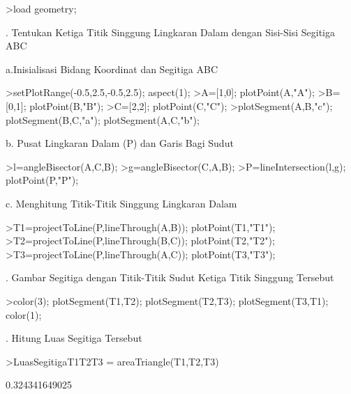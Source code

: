 \documentclass{article}
\newenvironment{eulernotebook}{\par}{\par}
\newenvironment{eulercomment}{\par\medskip}{\par\medskip}
\begin{document}
\begin{eulernotebook}
\begin{eulercomment}
\end{eulercomment}
\begin{eulerprompt}
>load geometry;
\end{eulerprompt}
\begin{eulercomment}
1. Tentukan Ketiga Titik Singgung Lingkaran Dalam dengan Sisi-Sisi
Segitiga ABC\\
\end{eulercomment}
\begin{eulerttcomment}
   a.Inisialisasi Bidang Koordinat dan Segitiga ABC
\end{eulerttcomment}
\begin{eulerprompt}
>setPlotRange(-0.5,2.5,-0.5,2.5); aspect(1);
>A=[1,0]; plotPoint(A,"A");
>B=[0,1]; plotPoint(B,"B");
>C=[2,2]; plotPoint(C,"C");
>plotSegment(A,B,"c"); plotSegment(B,C,"a"); plotSegment(A,C,"b");
\end{eulerprompt}
\begin{eulerttcomment}
   b. Pusat Lingkaran Dalam (P) dan Garis Bagi Sudut
\end{eulerttcomment}
\begin{eulerprompt}
>l=angleBisector(A,C,B);
>g=angleBisector(C,A,B);
>P=lineIntersection(l,g); plotPoint(P,"P");
\end{eulerprompt}
\begin{eulerttcomment}
   c.  Menghitung Titik-Titik Singgung Lingkaran Dalam
\end{eulerttcomment}
\begin{eulerprompt}
>T1=projectToLine(P,lineThrough(A,B)); plotPoint(T1,"T1");
>T2=projectToLine(P,lineThrough(B,C)); plotPoint(T2,"T2");
>T3=projectToLine(P,lineThrough(A,C)); plotPoint(T3,"T3");
\end{eulerprompt}
\begin{eulercomment}
2. Gambar Segitiga dengan Titik-Titik Sudut Ketiga Titik Singgung
Tersebut
\end{eulercomment}
\begin{eulerprompt}
>color(3); plotSegment(T1,T2); plotSegment(T2,T3); plotSegment(T3,T1); color(1);
\end{eulerprompt}
\begin{eulercomment}
3. Hitung Luas Segitiga Tersebut
\end{eulercomment}
\begin{eulerprompt}
>LuasSegitigaT1T2T3 = areaTriangle(T1,T2,T3)
\end{eulerprompt}
\begin{euleroutput}
  0.324341649025
\end{euleroutput}

\end{eulernotebook}
\end{document}
